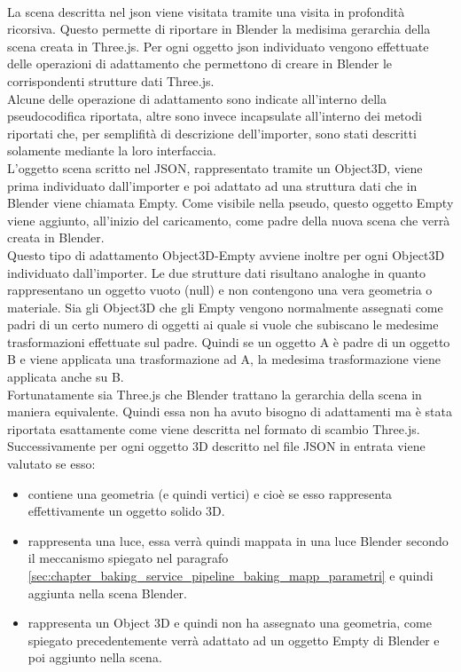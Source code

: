 \\
La scena descritta nel json viene visitata tramite una visita in profondità ricorsiva. 
Questo permette di riportare in Blender la medisima gerarchia della scena creata in Three.js.
Per ogni oggetto json individuato vengono effettuate delle operazioni di adattamento che permettono di creare in Blender le corrispondenti strutture dati Three.js.
\\
Alcune delle operazione di adattamento sono indicate all’interno della pseudocodifica riportata, altre sono invece incapsulate all’interno dei metodi riportati che, per semplifità di descrizione dell’importer, sono stati descritti solamente mediante la loro interfaccia.
\\
L’oggetto scena scritto nel JSON, rappresentato  tramite un Object3D, viene prima individuato dall’importer e poi  adattato ad una struttura dati che in Blender viene chiamata Empty. 
Come visibile nella pseudo, questo oggetto Empty viene aggiunto, all’inizio del caricamento, come padre della nuova scena che verrà creata in Blender.
\\
Questo tipo di adattamento Object3D-Empty avviene inoltre per ogni Object3D individuato dall’importer.
Le due strutture dati risultano analoghe in quanto rappresentano un oggetto vuoto (null) e non contengono una vera geometria o materiale. Sia gli Object3D che gli Empty vengono normalmente assegnati come padri di un certo numero di oggetti ai quale si vuole che subiscano le medesime trasformazioni effettuate sul padre. Quindi se un oggetto A è padre di un oggetto B e viene applicata una trasformazione ad A, la medesima trasformazione viene applicata anche su B.
\\
Fortunatamente sia Three.js che Blender trattano la gerarchia della scena in maniera equivalente. Quindi essa non ha avuto bisogno di adattamenti ma è stata riportata esattamente come viene descritta nel formato di scambio Three.js.
\\
Successivamente per ogni oggetto 3D descritto nel file JSON in entrata viene valutato se esso:
\begin{itemize}
\item contiene una geometria (e quindi vertici) e cioè se esso rappresenta effettivamente un oggetto solido 3D.
\item rappresenta una luce, essa verrà quindi mappata in una luce Blender secondo il meccanismo spiegato nel paragrafo \ref{sec:chapter_baking_service_pipeline_baking_mapp_parametri} e quindi aggiunta nella scena Blender.
\item rappresenta un Object 3D e quindi non ha assegnato una geometria, come spiegato precedentemente verrà adattato ad un oggetto Empty di Blender e poi aggiunto nella scena.
\end{itemize}
